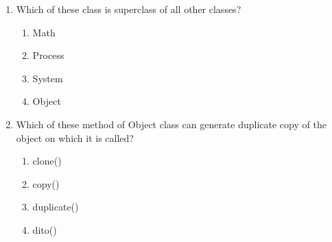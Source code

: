 \documentclass[11pt,a4paper]{article}
\begin{document}
\begin{enumerate}
\item  Which of these class is superclass of all other classes?
    \begin{enumerate}
        \item Math
        \item Process
        \item System
        \item Object
    \end{enumerate}
    
\item  Which of these method of Object class can generate duplicate copy of the object on which it is called?
    \begin{enumerate}
        \item clone()
        \item copy()
        \item duplicate()
        \item dito()
    \end{enumerate}
\end{enumerate}
\end{document}
